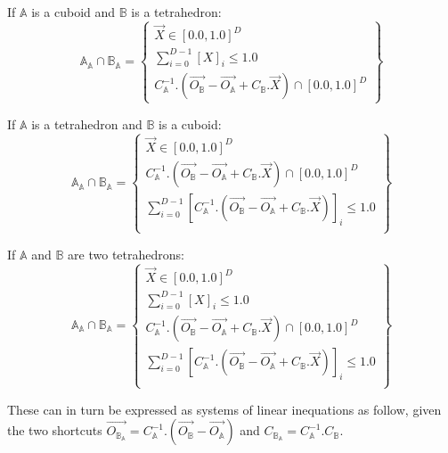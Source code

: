 \documentclass[12pt, a4paper]{article}
\begin{document}
If $\mathbb{A}$ is a cuboid and $\mathbb{B}$ is a tetrahedron:
\begin{equation}
\mathbb{A}_\mathbb{A}\cap\mathbb{B}_\mathbb{A}=\left\lbrace
\begin{array}{c}
\overrightarrow{X}\in[0.0,1.0]^D\\
\sum_{i=0}^{D-1}\left[X\right]_i\le1.0\\
C_\mathbb{A}^{-1}.\left(\overrightarrow{O_\mathbb{B}}-\overrightarrow{O_\mathbb{A}}+C_\mathbb{B}.\overrightarrow{X}\right)\cap[0.0,1.0]^D
\end{array}
\right\rbrace
\end{equation}

If $\mathbb{A}$ is a tetrahedron and $\mathbb{B}$ is a cuboid:
\begin{equation}
\mathbb{A}_\mathbb{A}\cap\mathbb{B}_\mathbb{A}=\left\lbrace
\begin{array}{c}
\overrightarrow{X}\in[0.0,1.0]^D\\
C_\mathbb{A}^{-1}.\left(\overrightarrow{O_\mathbb{B}}-\overrightarrow{O_\mathbb{A}}+C_\mathbb{B}.\overrightarrow{X}\right)\cap[0.0,1.0]^D\\
\sum_{i=0}^{D-1}\left[C_\mathbb{A}^{-1}.\left(\overrightarrow{O_\mathbb{B}}-\overrightarrow{O_\mathbb{A}}+C_\mathbb{B}.\overrightarrow{X}\right)\right]_i\le1.0\\
\end{array}
\right\rbrace
\end{equation}

If $\mathbb{A}$ and $\mathbb{B}$ are two tetrahedrons:
\begin{equation}
\mathbb{A}_\mathbb{A}\cap\mathbb{B}_\mathbb{A}=\left\lbrace
\begin{array}{c}
\overrightarrow{X}\in[0.0,1.0]^D\\
\sum_{i=0}^{D-1}\left[X\right]_i\le1.0\\
C_\mathbb{A}^{-1}.(\overrightarrow{O_\mathbb{B}}-\overrightarrow{O_\mathbb{A}}+C_\mathbb{B}.\overrightarrow{X})\cap[0.0,1.0]^D\\
\sum_{i=0}^{D-1}\left[C_\mathbb{A}^{-1}.\left(\overrightarrow{O_\mathbb{B}}-\overrightarrow{O_\mathbb{A}}+C_\mathbb{B}.\overrightarrow{X}\right)\right]_i\le1.0\\
\end{array}
\right\rbrace
\end{equation}

These can in turn be expressed as systems of linear inequations as follow, given the two shortcuts $\overrightarrow{O_{\mathbb{B}_\mathbb{A}}}=C_\mathbb{A}^{-1}.(\overrightarrow{O_\mathbb{B}}-\overrightarrow{O_\mathbb{A}})$ and $C_{\mathbb{B}_\mathbb{A}}=C_\mathbb{A}^{-1}.C_{\mathbb{B}}$.
\end{document}
